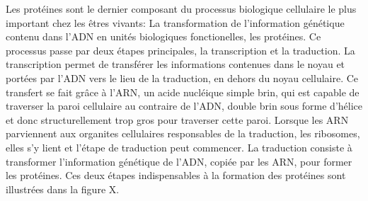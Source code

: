 Les protéines sont le dernier composant du processus biologique cellulaire le plus important chez les êtres vivants: La transformation de l'information génétique contenu dans l'ADN en unités biologiques fonctionelles, les protéines. Ce processus passe par deux étapes principales, la transcription et la traduction. La transcription permet de transférer les informations contenues dans le noyau et portées par l'ADN vers le lieu de la traduction, en dehors du noyau cellulaire. Ce transfert se fait grâce à l'ARN, un acide nucléique simple brin, qui est capable de traverser la paroi cellulaire au contraire de l'ADN, double brin sous forme d'hélice et donc structurellement trop gros pour traverser cette paroi. Lorsque les ARN parviennent aux organites cellulaires responsables de la traduction, les ribosomes, elles s'y lient et l'étape de traduction peut commencer. La traduction consiste à transformer l'information génétique de l'ADN, copiée par les ARN, pour former les protéines. Ces deux étapes indispensables à la formation des protéines sont illustrées dans la figure X.


